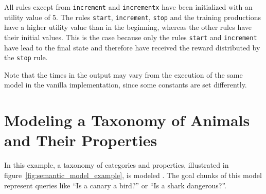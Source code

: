 All rules except from \lstinline|increment| and \lstinline|incrementx| have been initialized with an utility value of 5. The rules \lstinline|start|, \lstinline|increment|, \lstinline|stop| and the training productions have a higher utility value than in the beginning, whereas the other rules have their initial values. This is the case because only the rules \lstinline|start| and \lstinline|increment| have lead to the final state and therefore have received the reward distributed by the \lstinline|stop| rule.

Note that the times in the output may vary from the execution of the same model in the vanilla implementation, since some constants are set differently.


\section{Modeling a Taxonomy of Animals and Their Properties}

In this example, a taxonomy of categories and properties, illustrated in figure~\ref{fig:semantic_model_example}, is modeled \cite[unit 1, pp. 24\psqq]{actr_tutorial}. The goal chunks of this model represent queries like ``Is a canary a bird?'' or ``Is a shark dangerous?''.

